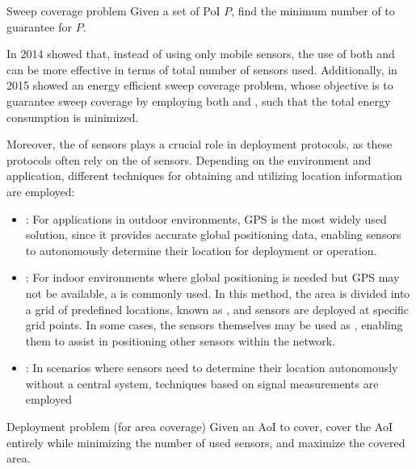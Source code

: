 \documentclass[a4paper, 12pt]{report}
\begin{document}
    \begin{frameddefn}{Sweep coverage problem}
        Given a set of PoI $P$, find the minimum number of  to guarantee  for $P$.
    \end{frameddefn}

    In 2014 \textcite{gorain14} showed that, instead of using only mobile sensors, the use of both  and  can be more effective in terms of total number of sensors used. Additionally, in 2015 \textcite{gorain15} showed an energy efficient sweep coverage problem, whose objective is to guarantee sweep coverage by employing both  and , such that the total energy consumption is minimized.

    Moreover, the  of sensors plays a crucial role in deployment protocols, as these protocols often rely on the  of sensors. Depending on the environment and application, different techniques for obtaining and utilizing location information are employed:

    \begin{itemize}
        \item {}: For applications in outdoor environments, GPS is the most widely used solution, since it provides accurate global positioning data, enabling sensors to autonomously determine their location for deployment or operation.
        \item {}: For indoor environments where global positioning is needed but GPS may not be available, a  is commonly used. In this method, the area is divided into a grid of predefined locations, known as , and sensors are deployed at specific grid points. In some cases, the sensors themselves may be used as , enabling them to assist in positioning other sensors within the network.
        \item {}: In scenarios where sensors need to determine their location autonomously without a central system, techniques based on signal measurements are employed
    \end{itemize}

    \begin{frameddefn}{Deployment problem (for area coverage)}
        Given an AoI to cover, cover the AoI entirely while minimizing the number of used sensors, and maximize the covered area.
    \end{frameddefn}
\end{document}
